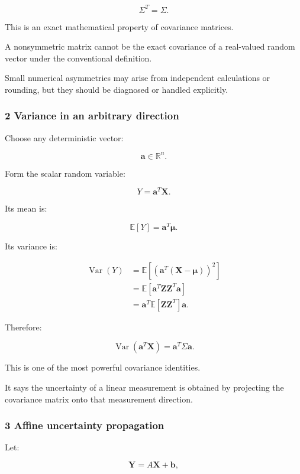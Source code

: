 \[
 \boxed{\Sigma^T=\Sigma}.
\]

This is an exact mathematical property of covariance matrices.

A nonsymmetric matrix cannot be the exact covariance of a real-valued random vector under the conventional definition.

Small numerical asymmetries may arise from independent calculations or rounding, but they should be diagnosed or handled explicitly.

\subsubsection{2 Variance in an arbitrary direction}\label{02-foundations-ii-ch024-variance-in-an-arbitrary-direction}

Choose any deterministic vector:

\[
 \mathbf a\in\mathbb R^n.
\]

Form the scalar random variable:

\[
 Y=\mathbf a^T\mathbf X.
\]

Its mean is:

\[
 \mathbb E[Y]=\mathbf a^T\boldsymbol\mu.
\]

Its variance is:

\[
 \begin{aligned} \operatorname{Var}(Y) &= \mathbb E[ (\mathbf a^T(\mathbf X-\boldsymbol\mu))^2 ]\\ &= \mathbb E[ \mathbf a^T\mathbf Z\mathbf Z^T\mathbf a ]\\ &= \mathbf a^T\mathbb E[\mathbf Z\mathbf Z^T]\mathbf a. \end{aligned}
\]

Therefore:

\[
 \boxed{ \operatorname{Var}(\mathbf a^T\mathbf X) = \mathbf a^T\Sigma\mathbf a }.
\]

This is one of the most powerful covariance identities.

It says the uncertainty of a linear measurement is obtained by projecting the covariance matrix onto that measurement direction.

\subsubsection{3 Affine uncertainty propagation}\label{02-foundations-ii-ch024-affine-uncertainty-propagation}

Let:

\[
 \mathbf Y=A\mathbf X+\mathbf b,
\]


